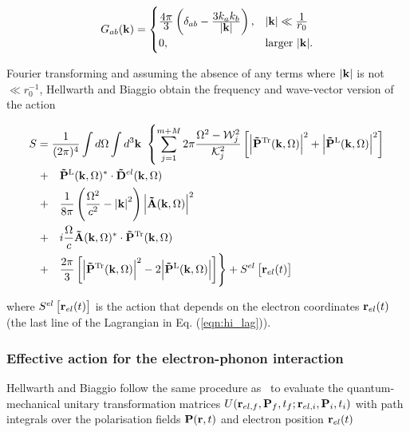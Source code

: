 \begin{equation}
    G_{ab}(\vb{k}) =
    \begin{cases}
        \frac{\displaystyle 4\pi}{\displaystyle 3} \left( \delta_{ab} - \frac{\displaystyle 3k_a k_b}{\displaystyle \abs{\vb{k}}} \right), & \abs{\vb{k}} \ll \frac{\displaystyle 1}{\displaystyle r_0} \\
        0, & \text{larger } \abs{\vb{k}}.
    \end{cases}
\end{equation}

Fourier transforming and assuming the absence of any terms where $\abs{\vb{k}}$ is not $\ll r_0^{-1}$, Hellwarth and Biaggio obtain the frequency and wave-vector version of the action

\begin{equation}
    \begin{aligned}
        S &= \frac{1}{(2\pi)^4} \int d\Omega \int d^3 \vb{k}\ \left\{ \sum_{j=1}^{m+M} 2\pi \frac{\Omega^2 - \mathcal{W}_j^2}{\mathcal{K}_j^2} \left[ \abs{\vb{\Tilde{P}}^{\text{Tr}}(\vb{k}, \Omega)}^2 + \abs{\vb{\Tilde{P}}^{\text{L}}(\vb{k}, \Omega)}^2 \right] \right. \\
        &\left. +\quad \vb{\Tilde{P}}^{\text{L}}(\vb{k}, \Omega)^* \cdot \vb{\Tilde{D}}^{el}(\vb{k}, \Omega) \right. \\
        &\left. +\quad \frac{1}{8\pi} \left( \frac{\Omega^2}{c^2} - \abs{\vb{k}}^2 \right) \abs{\vb{\Tilde{A}}(\vb{k}, \Omega)}^2 \right. \\
        & \left. +\quad i \frac{\Omega}{c} \vb{\Tilde{A}}(\vb{k}, \Omega)^* \cdot \vb{\Tilde{P}}^{\text{Tr}}(\vb{k}, \Omega) \right. \\
        &\left. +\quad  \frac{2\pi}{3} \left[ \abs{\vb{\Tilde{P}}^{\text{Tr}}(\vb{k}, \Omega)}^2 - 2\abs{\vb{\Tilde{P}}^{\text{L}}(\vb{k}, \Omega)} \right] \right\} + S^{el} \left[ \vb{r}_{el}(t) \right]
    \end{aligned}
\end{equation}

where $S^{el} \left[ \vb{r}_{el}(t) \right]$ is the action that depends on the electron coordinates $\vb{r}_{el}(t)$ (the last line of the Lagrangian in Eq. (\ref{eqn:hi_lag})).

\subsubsection{Effective action for the electron-phonon interaction}

Hellwarth and Biaggio follow the same procedure as~\cite{feynman_slow_1955} to evaluate the quantum-mechanical unitary transformation matrices $U(\vb{r}_{el, f}, \vb{P}_f, t_f; \vb{r}_{el, i}, \vb{P}_i, t_i)$ with path integrals over the polarisation fields $\vb{P}(\vb{r}, t)$ and electron position $\vb{r}_{el}(t)$


